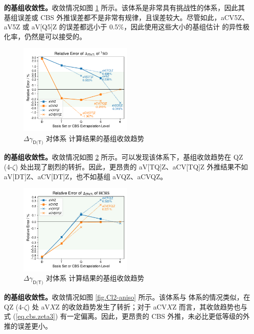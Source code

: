 \textbf{ 的基组收敛性。}收敛情况如图 \ref{fig.SO-aniso} 所示。该体系是非常具有挑战性的体系，因此其基组误差或 CBS 外推误差都不是非常有规律，且误差较大。尽管如此，aCV5Z、aV5Z 或 aV[Q5]Z 的误差都远小于 0.5\%，因此使用这些大小的基组估计  的异性极化率，仍然是可以接受的。

\begin{figure}[ht]
    \centering
    \caption{$\Delta \gamma_\textsf{D(T)}$ 对体系  计算结果的基组收敛趋势}
    \label{fig.SO-aniso}
    \includegraphics[width=0.5\textwidth]{assets/SO-aniso.pdf}
\end{figure}

\textbf{ 的基组收敛性。}收敛情况如图 \ref{fig.HCHS-aniso} 所示。可以发现该体系下，基组收敛趋势在 QZ (4-$\zeta$) 处出现了剧烈的转折。因此，更昂贵的 aV[TQ]Z、aCV[TQ]Z 外推结果不如 aV[DT]Z、aCV[DT]Z，也不如基组 aVQZ、aCVQZ。

\begin{figure}[ht]
    \centering
    \caption{$\Delta \gamma_\textsf{D(T)}$ 对体系  计算结果的基组收敛趋势}
    \label{fig.HCHS-aniso}
    \includegraphics[width=0.5\textwidth]{assets/HCHS-aniso.pdf}
\end{figure}

\textbf{ 的基组收敛性。}收敛情况如图 \ref{fig.Cl2-aniso} 所示。该体系与  体系的情况类似，在 QZ (4-$\zeta$) 处 aV$X$Z 的收敛趋势发生了转折；对于 aCV$X$Z 而言，其收敛趋势也与式 (\ref{eq.cbs.zeta3}) 有一定偏离。因此，更昂贵的 CBS 外推，未必比更低等级的外推的误差更小。

